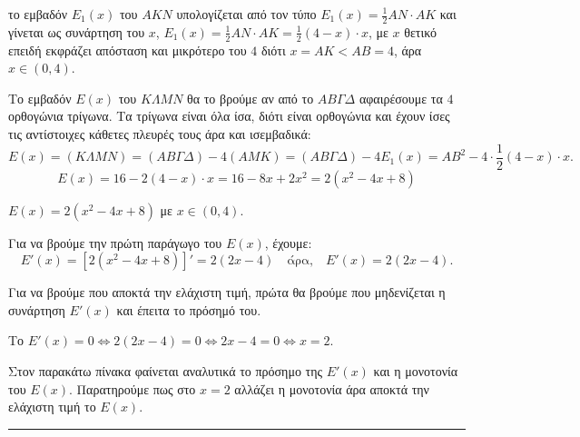 \begin{alist}
\item 
    \begin{rlist}
        \item το εμβαδόν $E_1(x)$ του $AKN$ υπολογίζεται από τον τύπο $E_1(x) = \frac{1}{2} AN \cdot AK$ και γίνεται ως συνάρτηση του $x$, $E_1(x) = \frac{1}{2} AN \cdot AK = \frac{1}{2} (4 - x) \cdot x$, με $x$ θετικό επειδή εκφράζει απόσταση και μικρότερο του $4$ διότι $x = AK < AB = 4$, άρα $x \in (0,4)$.
        \item Το εμβαδόν $E(x)$ του $K\Lambda MN$ θα το βρούμε αν από το $AB\Gamma\Delta$ αφαιρέσουμε τα $4$ ορθογώνια τρίγωνα. Τα τρίγωνα είναι όλα ίσα, διότι είναι ορθογώνια και έχουν ίσες τις αντίστοιχες κάθετες πλευρές τους άρα και ισεμβαδικά:
        \[ E(x) = (K\Lambda MN) = (AB\Gamma\Delta) - 4(AMK) = (AB\Gamma\Delta) - 4E_1(x) = AB^2 - 4 \cdot \frac{1}{2}(4 - x) \cdot x. \]
        \[ E(x) = 16 - 2(4 - x) \cdot x = 16 - 8x + 2x^2 = 2(x^2 - 4x + 8) \]
        
        $E(x) = 2(x^2 - 4x + 8)$ με $x \in (0,4)$.
    \end{rlist}
\item Για να βρούμε την πρώτη παράγωγο του $E(x)$, έχουμε:
    \[ E'(x) = [2(x^2 - 4x + 8)]' = 2(2x - 4) \quad \text{άρα,} \quad E'(x) = 2(2x - 4). \]
\item Για να βρούμε που αποκτά την ελάχιστη τιμή, πρώτα θα βρούμε που μηδενίζεται η συνάρτηση $E'(x)$ και έπειτα το πρόσημό του.
    
    Το $E'(x) = 0 \Leftrightarrow 2(2x - 4) = 0 \Leftrightarrow 2x - 4 = 0 \Leftrightarrow x = 2$.
    
    Στον παρακάτω πίνακα φαίνεται αναλυτικά το πρόσημο της $E'(x)$ και η μονοτονία του $E(x)$. Παρατηρούμε πως στο $x = 2$ αλλάζει η μονοτονία άρα αποκτά την ελάχιστη τιμή το $E(x)$.

    \begin{center}
    \end{center}
\end{alist}
\vspace{6mm}
\noindent\rule{\textwidth}{0.4pt}
\vspace{6mm}

